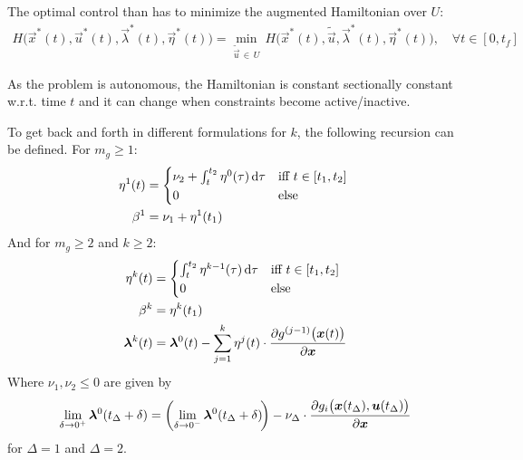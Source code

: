 				The optimal control than has to minimize the augmented Hamiltonian over \(U\):
				\begin{align*}
					H\big(\vec{x}^\ast(t), \vec{u}^\ast(t), \vec{\lambda}^\ast(t), \vec{\eta}^\ast(t)\big) = \min_{\tilde{\vec{u}} \,\in\, U} \, H\big(\vec{x}^\ast(t), \tilde{\vec{u}}, \vec{\lambda}^\ast(t), \vec{\eta}^\ast(t)\big),\quad \forall t \in [0, t_f]
				\end{align*}

				As the problem is autonomous, the Hamiltonian is constant sectionally constant w.r.t. time \(t\) and it can change when constraints become active/inactive.

				To get back and forth in different formulations for \(k\), the following recursion can be defined. For \( m_g \geq 1 \):
				\begin{align*}
					\eta^1(t) &=
						\begin{cases*}
							\nu_2 + \int_{t}^{t_2} \eta^0(\tau) \dd{\tau} & iff \( t \in [t_1, t_2] \) \\
							0 & else
						\end{cases*} \\
					\beta^1 &= \nu_1 + \eta^1(t_1)
				\end{align*}
				And for \( m_g \geq 2 \) and \( k \geq 2 \):
				\begin{align*}
					\eta^k(t) &=
						\begin{cases*}
							\int_{t}^{t_2} \eta^{k - 1}(\tau) \dd{\tau} & iff \( t \in [t_1, t_2] \) \\
							0 & else
						\end{cases*} \\
					\beta^k &= \eta^k(t_1) \\
					\vec{\lambda}^k(t) &= \vec{\lambda}^0(t) - \sum_{j = 1}^{k} \eta^j(t) \cdot \pdv{g^{(j - 1)}\big(\vec{x}(t)\big)}{\vec{x}}
				\end{align*}
				Where \( \nu_1, \nu_2 \leq 0 \) are given by
				\begin{align*}
					\lim\limits_{\delta \to 0^+} \bm{\lambda}^0(t_\Delta + \delta) = \bigg(\! \lim\limits_{\delta \to 0^-} \bm{\lambda}^0(t_\Delta + \delta) \!\bigg) - \nu_\Delta \cdot \pdv{g_i\big(\bm{x}(t_\Delta), \bm{u}(t_\Delta)\big)}{\bm{x}}
				\end{align*}
				for \( \Delta = 1 \) and \( \Delta = 2 \).

